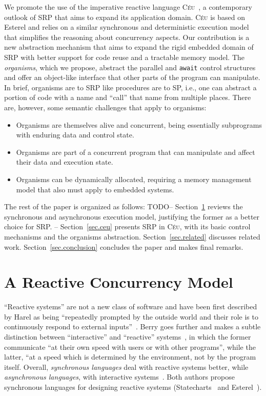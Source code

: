 \documentclass{acm_proc_article-sp}
\newcommand{\CEU}{\textsc{C\'{e}u}\xspace}
\newcommand{\code}[1] {{\small{\texttt{#1}}}}
\newcommand{\1}{\;}
\newcommand{\2}{\;\;}
\newcommand{\3}{\;\;\;}
\newcommand{\5}{\;\;\;\;\;}
\begin{document}
We promote the use of the imperative reactive language 
\CEU~\cite{ceu.sensys13}, a contemporary outlook of SRP that aims to expand its 
application domain.
%
\CEU is based on Esterel and relies on a similar synchronous and deterministic 
execution model that simplifies the reasoning about concurrency aspects.
%
Our contribution is a new abstraction mechanism that aims to expand the rigid 
embedded domain of SRP with better support for code reuse and a tractable 
memory model.
%
The \emph{organisms}, which we propose, abstract the parallel and \code{await} 
control structures and offer an object-like interface that other parts of the 
program can manipulate.
%
In brief, organisms are to SRP like procedures are to SP, i.e., one can 
abstract a portion of code with a name and ``call'' that name from multiple 
places.
%
There are, however, some semantic challenges that apply to organisms:
%
\begin{itemize}
\item Organisms are themselves alive and concurrent, being essentially 
subprograms with enduring data and control state.
\item Organisms are part of a concurrent program that can manipulate and affect 
their data and execution state.
\item Organisms can be dynamically allocated, requiring a memory management 
model that also must apply to embedded systems.
\end{itemize}

The rest of the paper is organized as follows:
TODO--
Section~\ref{sec.synchronous} reviews the synchronous and asynchronous 
execution model, justifying the former as a better choice for SRP.
--
Section~\ref{sec.ceu} presents SRP in \CEU, with its basic control mechanisms 
and the organisms abstraction.
Section~\ref{sec.related} discusses related work.
Section~\ref{sec.conclusion} concludes the paper and makes final remarks.

\section{A Reactive Concurrency Model}
\label{sec.synchronous}

``Reactive systems'' are not a new class of software and have been first 
described by Harel as being ``repeatedly prompted by the outside world and 
their role is to continuously respond to external 
inputs''~\cite{statecharts.reactive}.
%
Berry goes further and makes a subtle distinction between ``interactive'' and 
``reactive'' systems~\cite{rp.synchronous}, in which the former communicate 
``at their own speed with users or with other programs'', while the latter, 
``at a speed which is determined by the environment, not by the program itself.
%
Overall, \emph{synchronous languages} deal with reactive systems better, while 
\emph{asynchronous languages}, with interactive systems~\cite{esterel.crp}.
%
Both authors propose synchronous languages for designing reactive systems 
(Statecharts~\cite{statecharts.visual} and Esterel~\cite{esterel.ieee91}).
\end{document}
